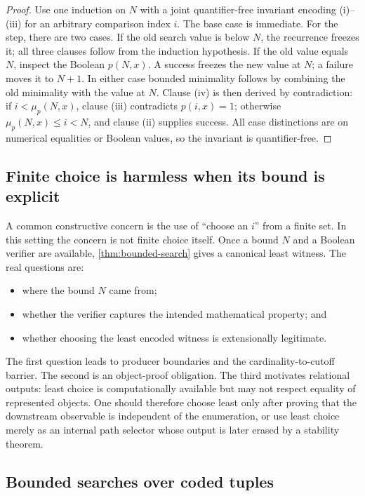 \begin{proof}
Use one induction on \(N\) with a joint quantifier-free invariant encoding (i)--(iii)
for an arbitrary comparison index \(i\).  The base case is immediate.  For the step,
there are two cases.  If the old search value is below \(N\), the recurrence freezes
it; all three clauses follow from the induction hypothesis.  If the old value equals
\(N\), inspect the Boolean \(p(N,x)\).  A success freezes the new value at \(N\); a
failure moves it to \(N+1\).  In either case bounded minimality follows by combining
the old minimality with the value at \(N\).  Clause (iv) is then derived by
contradiction: if \(i<\mu_p(N,x)\), clause (iii) contradicts \(p(i,x)=1\); otherwise
\(\mu_p(N,x)\le i<N\), and clause (ii) supplies success.  All case distinctions are on
numerical equalities or Boolean values, so the invariant is quantifier-free.
\end{proof}

\subsection{Finite choice is harmless when its bound is explicit}

A common constructive concern is the use of ``choose an \(i\)'' from a finite set.
In this setting the concern is not finite choice itself.  Once a bound \(N\) and a
Boolean verifier are available, \cref{thm:bounded-search} gives a canonical least
witness.  The real questions are:

\begin{itemize}
\item where the bound \(N\) came from;
\item whether the verifier captures the intended mathematical property; and
\item whether choosing the least encoded witness is extensionally legitimate.
\end{itemize}

The first question leads to producer boundaries and the cardinality-to-cutoff barrier.
The second is an object-proof obligation.  The third motivates relational outputs:
least choice is computationally available but may not respect equality of represented
objects.  One should therefore choose least only after proving that the downstream
observable is independent of the enumeration, or use least choice merely as an
internal path selector whose output is later erased by a stability theorem.

\subsection{Bounded searches over coded tuples}

